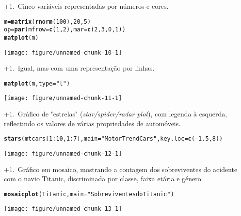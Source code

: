 \documentclass{article}\usepackage[]{graphicx}\usepackage[]{color}
\makeatletter
\def\maxwidth{ %
  \ifdim\Gin@nat@width>\linewidth
    \linewidth
  \else
    \Gin@nat@width
  \fi
}
\newcommand{\hlnum}[1]{\textcolor[rgb]{0.686,0.059,0.569}{#1}}%
\newcommand{\hlstr}[1]{\textcolor[rgb]{0.192,0.494,0.8}{#1}}%
\newcommand{\hlopt}[1]{\textcolor[rgb]{0,0,0}{#1}}%
\newcommand{\hlstd}[1]{\textcolor[rgb]{0.345,0.345,0.345}{#1}}%
\newcommand{\hlkwb}[1]{\textcolor[rgb]{0.69,0.353,0.396}{#1}}%
\newcommand{\hlkwc}[1]{\textcolor[rgb]{0.333,0.667,0.333}{#1}}%
\newcommand{\hlkwd}[1]{\textcolor[rgb]{0.737,0.353,0.396}{\textbf{#1}}}%
\newenvironment{kframe}{%
 \def\at@end@of@kframe{}%
 \ifinner\ifhmode%
  \def\at@end@of@kframe{\end{minipage}}%
  \begin{minipage}{\columnwidth}%
 \fi\fi%
 \def\FrameCommand##1{\hskip\@totalleftmargin \hskip-\fboxsep
 \colorbox{shadecolor}{##1}\hskip-\fboxsep
     \hskip-\linewidth \hskip-\@totalleftmargin \hskip\columnwidth}%
 \MakeFramed {\advance\hsize-\width
   \@totalleftmargin\z@ \linewidth\hsize
   \@setminipage}}%
 {\par\unskip\endMakeFramed%
 \at@end@of@kframe}
\newenvironment{knitrout}{}{} %
\newcounter{graph}[section]
\renewcommand{\thegraph}{\number\numexpr\value{graph}+1\relax.~\stepcounter{graph}}
\makeatother
\begin{document}
\thegraph Cinco variáveis representadas por números e cores.
\begin{knitrout}
\color{fgcolor}\begin{kframe}
\begin{alltt}
\hlstd{m} \hlkwb{=} \hlkwd{matrix}\hlstd{(}\hlkwd{rnorm}\hlstd{(}\hlnum{100}\hlstd{),} \hlnum{20}\hlstd{,} \hlnum{5}\hlstd{)}
\hlstd{op} \hlkwb{=} \hlkwd{par}\hlstd{(}\hlkwc{mfrow} \hlstd{=} \hlkwd{c}\hlstd{(}\hlnum{1}\hlstd{,} \hlnum{2}\hlstd{),} \hlkwc{mar} \hlstd{=} \hlkwd{c}\hlstd{(}\hlnum{2}\hlstd{,} \hlnum{3}\hlstd{,} \hlnum{0}\hlstd{,} \hlnum{1}\hlstd{))}
\hlkwd{matplot}\hlstd{(m)}
\end{alltt}
\end{kframe}
\texttt{[image: figure/unnamed-chunk-10-1]} 

\end{knitrout}
\pagebreak
\thegraph Igual, mas com uma representação por linhas.
\begin{knitrout}
\color{fgcolor}\begin{kframe}
\begin{alltt}
\hlkwd{matplot}\hlstd{(m,} \hlkwc{type} \hlstd{=} \hlstr{"l"}\hlstd{)}
\end{alltt}
\end{kframe}
\texttt{[image: figure/unnamed-chunk-11-1]} 

\end{knitrout}
\pagebreak
\thegraph Gráfico de "estrelas" (\textit{star/spider/radar plot}), com legenda à esquerda,
reflectindo os valores de várias propriedades de automóveis.
\begin{knitrout}
\color{fgcolor}\begin{kframe}
\begin{alltt}
\hlkwd{stars}\hlstd{(mtcars[}\hlnum{1}\hlopt{:}\hlnum{10}\hlstd{,} \hlnum{1}\hlopt{:}\hlnum{7}\hlstd{],} \hlkwc{main} \hlstd{=} \hlstr{"Motor Trend Cars"}\hlstd{,} \hlkwc{key.loc}\hlstd{=}\hlkwd{c}\hlstd{(}\hlopt{-}\hlnum{1.5}\hlstd{,} \hlnum{8}\hlstd{))}
\end{alltt}
\end{kframe}

{\centering \texttt{[image: figure/unnamed-chunk-12-1]} 

}



\end{knitrout}
\pagebreak
\thegraph Gráfico em mosaico, mostrando a contagem dos sobreviventes do acidente com
o navio Titanic, discriminada por classe, faixa etária e género.
\begin{knitrout}
\color{fgcolor}\begin{kframe}
\begin{alltt}
\hlkwd{mosaicplot}\hlstd{(Titanic,} \hlkwc{main} \hlstd{=} \hlstr{"Sobreviventes do Titanic"}\hlstd{)}
\end{alltt}
\end{kframe}
\texttt{[image: figure/unnamed-chunk-13-1]} 

\end{knitrout}
\pagebreak
\end{document}
